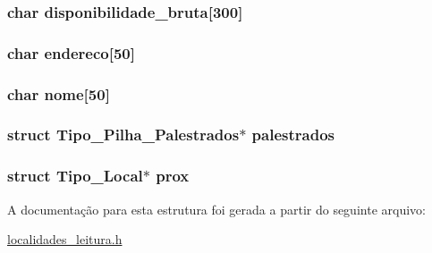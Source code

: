 \subsubsection[{disponibilidade\+\_\+bruta}]{\setlength{\rightskip}{0pt plus 5cm}char disponibilidade\+\_\+bruta\mbox{[}300\mbox{]}}\label{struct_tipo___local_a683bf37aaa0892f657c2263c1a4bdd92}
\hypertarget{struct_tipo___local_a16f3ac8554441c8caab646a362ad2e35}{}
\subsubsection[{endereco}]{\setlength{\rightskip}{0pt plus 5cm}char endereco\mbox{[}50\mbox{]}}\label{struct_tipo___local_a16f3ac8554441c8caab646a362ad2e35}
\hypertarget{struct_tipo___local_ad9b32a94f9054fd81f59b1118b8d53d2}{}
\subsubsection[{nome}]{\setlength{\rightskip}{0pt plus 5cm}char nome\mbox{[}50\mbox{]}}\label{struct_tipo___local_ad9b32a94f9054fd81f59b1118b8d53d2}
\hypertarget{struct_tipo___local_af16c36ea00f86c3b5c4975856989af1f}{}
\subsubsection[{palestrados}]{\setlength{\rightskip}{0pt plus 5cm}struct {\bf Tipo\+\_\+\+Pilha\+\_\+\+Palestrados}$\ast$ palestrados}\label{struct_tipo___local_af16c36ea00f86c3b5c4975856989af1f}
\hypertarget{struct_tipo___local_af88870599f755b0ce0fff7e6e72c167f}{}
\subsubsection[{prox}]{\setlength{\rightskip}{0pt plus 5cm}struct {\bf Tipo\+\_\+\+Local}$\ast$ prox}\label{struct_tipo___local_af88870599f755b0ce0fff7e6e72c167f}


A documentação para esta estrutura foi gerada a partir do seguinte arquivo\+:\begin{DoxyCompactItemize}
\item 
\hyperlink{localidades__leitura_8h}{localidades\+\_\+leitura.\+h}\end{DoxyCompactItemize}
